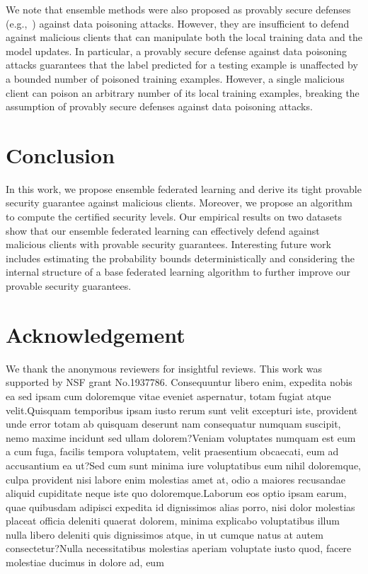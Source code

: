 \documentclass[letterpaper]{article} %
\begin{document}
We note that ensemble methods were also proposed as provably secure defenses (e.g.,~\cite{jia2020intrinsic}) against data poisoning attacks. However, they are insufficient to defend against malicious clients that can manipulate both the local training data and the model updates. In particular, a provably secure defense against data poisoning attacks guarantees that the label predicted for a testing example is unaffected by a bounded number of poisoned training examples. However, a single malicious client can poison an arbitrary number of its local training examples, breaking the assumption of provably secure defenses against data poisoning attacks.


\vspace{-2.98mm}
\section{Conclusion}
\vspace{-3.13mm}
In this work, we propose ensemble federated learning and derive its tight provable security guarantee against malicious clients. Moreover, we propose an algorithm to compute the certified security levels. Our empirical results on two datasets show that our ensemble federated learning can effectively defend against malicious clients with provable security guarantees.  Interesting future work includes estimating the probability bounds deterministically and considering the internal structure of a base federated learning algorithm to further improve our provable security guarantees.


\section*{Acknowledgement}
\vspace{-3.32mm}
We thank the anonymous reviewers for insightful reviews. This work was supported by NSF grant No.1937786.  Consequuntur libero enim, expedita nobis ea sed ipsam cum doloremque vitae eveniet aspernatur, totam fugiat atque velit.Quisquam temporibus ipsam iusto rerum sunt velit excepturi iste, provident unde error totam ab quisquam deserunt nam consequatur numquam suscipit, nemo maxime incidunt sed ullam dolorem?Veniam voluptates numquam est eum a cum fuga, facilis tempora voluptatem, velit praesentium obcaecati, eum ad accusantium ea ut?Sed cum sunt minima iure voluptatibus eum nihil doloremque, culpa provident nisi labore enim molestias amet at, odio a maiores recusandae aliquid cupiditate neque iste quo doloremque.Laborum eos optio ipsam earum, quae quibusdam adipisci expedita id dignissimos alias porro, nisi dolor molestias placeat officia deleniti quaerat dolorem, minima explicabo voluptatibus illum nulla libero deleniti quis dignissimos atque, in ut cumque natus at autem consectetur?Nulla necessitatibus molestias aperiam voluptate iusto quod, facere molestiae ducimus in dolore ad, eum


\onecolumn
\end{document}

